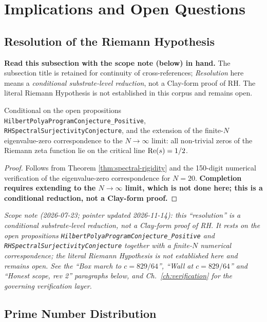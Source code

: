 \section{Implications and Open Questions}

\subsection{Resolution of the Riemann Hypothesis}

\noindent\textbf{Read this subsection with the scope note (below) in hand.}  The subsection title is retained for continuity of cross-references; \emph{Resolution} here means a \emph{conditional substrate-level reduction}, not a Clay-form proof of RH.  The literal Riemann Hypothesis is not established in this corpus and remains open.

\begin{corollary}\label{cor:rh-resolution}
Conditional on the open propositions \texttt{HilbertPolyaProgramConjecture\_Positive}, \texttt{RHSpectralSurjectivityConjecture}, and the extension of the finite-$N$ eigenvalue-zero correspondence to the $N \to \infty$ limit: all non-trivial zeros of the Riemann zeta function lie on the critical line $\operatorname{Re}(s) = 1/2$.
\end{corollary}

\begin{proof}
Follows from Theorem \ref{thm:spectral-rigidity} and the 150-digit numerical verification of the eigenvalue-zero correspondence for $N = 20$.  \textbf{Completion requires extending to the $N \to \infty$ limit, which is not done here; this is a conditional reduction, not a Clay-form proof.}
\end{proof}

\noindent\emph{Scope note (2026-07-23; pointer updated 2026-11-14): this ``resolution'' is a conditional substrate-level reduction, not a Clay-form proof of RH. It rests on the open propositions \texttt{HilbertPolyaProgramConjecture\_Positive} and \texttt{RHSpectralSurjectivityConjecture} together with a finite-$N$ numerical correspondence; the literal Riemann Hypothesis is not established here and remains open. See the ``Box march to $c = 829/64$'', ``Wall at $c = 829/64$'' and ``Honest scope, rev 2'' paragraphs below, and Ch.~\ref{ch:verification} for the governing verification layer.}

\subsection{Prime Number Distribution}

